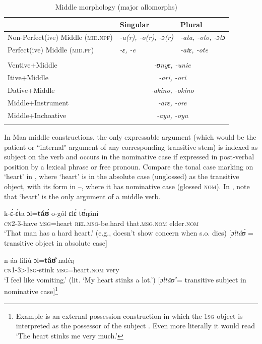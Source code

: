 \documentclass[output=paper,colorlinks,citecolor=brown
]{langscibook}
\begin{document}
\begin{table}
\caption{Middle morphology (major allomorphs)}
\label{tab:Payne:Middle}
\begin{tabular}{lll}
\lsptoprule
& Singular & Plural\\
\midrule
Non-Perfect(ive) Middle (\textsc{mid.npf}) & \textit{-a(r), -o(r), -ɔ(r)} & \textit{-ata, -oto, -ɔtɔ} \\
Perfect(ive) Middle (\textsc{mid.pf}) & \textit{-ɛ, -e} & \textit{-atɛ, -ote}\\
\\
Ventive+Middle & \multicolumn{2}{c}{\textit{-ʊnyɛ, -unie}}\\
Itive+Middle & \multicolumn{2}{c}{\textit{-ari, -ori}}\\
Dative+Middle & \multicolumn{2}{c}{\textit{-akino, -okino}}\\
Middle+Instrument & \multicolumn{2}{c}{\textit{-arɛ, -ore}}\\
Middle+Inchoative & \multicolumn{2}{c}{\textit{-ayu, -oyu}}\\
\lspbottomrule
\end{tabular}
\end{table}

In Maa middle constructions, the only expressable argument (which would be the patient or ``internal" argument of any corresponding transitive stem) is indexed as subject on the verb and occurs in the nominative case if expressed in post-verbal position by a lexical phrase or free pronoun. Compare the tonal case marking on `heart' in , where `heart' is in the absolute case (unglossed) as the transitive object, with its form in --, where it has nominative case (glossed \textsc{nom}). In  , note that `heart' is the only argument of a middle verb.

\ea\label{ex:Payne:active-trans}
\gll k-ɛ́-ɛ́ta ɔl=\textbf{táʊ́} o-gól ɛlɛ́  tʊ́ŋání \\
\textsc{cn2}-3-have \textsc{msg}=heart \textsc{rel.msg}-be.hard that.\textsc{msg.nom} elder.\textsc{nom}\\
\glt `That man has a hard heart.' (e.g., doesn't show concern when s.o. dies) [\textit{ɔltáʊ́} = transitive object in absolute case]
\z 

\ea\label{ex:Payne:active-trans2}
\gll n-áa-lilîû ɔl=\textbf{tâʊ̂} naléŋ\\
\textsc{cn1}-\textsc{3>1sg}-stink \textsc{msg}=heart.\textsc{nom} very\\
\glt `I feel like vomiting.' (lit. `My heart stinks a lot.')
[\textit{ɔltâʊ̂} = transitive subject in nominative case]\footnote{Example  is an external possession construction in which the \textsc{1sg} object is interpreted as the possessor of the subject \citep{Payne1997-extposs}. Even more literally it would read `The heart stinks me very much.'}
\z 
\end{document}
